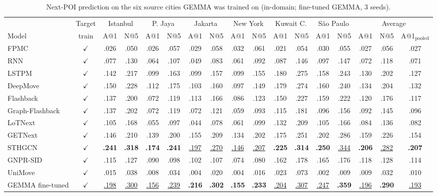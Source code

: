 \begin{table}[t]
\caption{Next-POI prediction on the six source cities GEMMA was trained on (in-domain; fine-tuned GEMMA, 3 seeds).}
\label{tab:main-source}
\scriptsize\setlength{\tabcolsep}{1.7pt}
\begin{tabular}{l c cc cc cc cc cc cc ccc}
\toprule
 & Target & \multicolumn{2}{c}{Istanbul} & \multicolumn{2}{c}{P. Jaya} & \multicolumn{2}{c}{Jakarta} & \multicolumn{2}{c}{New York} & \multicolumn{2}{c}{Kuwait C.} & \multicolumn{2}{c}{São Paulo} & \multicolumn{3}{c}{Average} \\
\cmidrule(lr){3-14}\cmidrule(lr){15-17}
Model & train & A@1 & N@5 & A@1 & N@5 & A@1 & N@5 & A@1 & N@5 & A@1 & N@5 & A@1 & N@5 & A@1 & N@5 & A@1$_{\text{pooled}}$ \\
\midrule
FPMC & $\checkmark$ & .026 & .050 & .026 & .057 & .029 & .058 & .032 & .061 & .021 & .054 & .030 & .055 & .027 & .056 & .027 \\
RNN & $\checkmark$ & .077 & .130 & .064 & .107 & .049 & .083 & .061 & .092 & .087 & .146 & .097 & .147 & .072 & .118 & .071 \\
LSTPM & $\checkmark$ & .142 & .217 & .099 & .163 & .099 & .157 & .099 & .155 & .180 & .275 & .158 & .243 & .130 & .202 & .127 \\
DeepMove & $\checkmark$ & .150 & .228 & .112 & .175 & .103 & .160 & .097 & .149 & .179 & .274 & .160 & .240 & .134 & .204 & .132 \\
Flashback & $\checkmark$ & .137 & .200 & .072 & .119 & .113 & .166 & .086 & .123 & .150 & .227 & .159 & .222 & .120 & .176 & .117 \\
Graph-Flashback & $\checkmark$ & .137 & .202 & .072 & .119 & .072 & .121 & .059 & .093 & .115 & .181 & .096 & .156 & .092 & .145 & .096 \\
LoTNext & $\checkmark$ & .105 & .168 & .055 & .097 & .044 & .078 & .061 & .099 & .132 & .209 & .105 & .166 & .084 & .136 & .082 \\
GETNext & $\checkmark$ & .146 & .210 & .139 & .200 & .155 & .209 & .134 & .202 & .175 & .251 & .202 & .286 & .159 & .226 & .154 \\
STHGCN & $\checkmark$ & \textbf{.241} & \textbf{.318} & \textbf{.174} & \textbf{.241} & \underline{.197} & \underline{.270} & \underline{.146} & \underline{.207} & \textbf{.225} & \textbf{.314} & \textbf{.250} & \underline{.344} & \textbf{.206} & \underline{.282} & \textbf{.207} \\
GNPR-SID & $\checkmark$ & .115 & .127 & .090 & .098 & .102 & .107 & .074 & .080 & .162 & .178 & .165 & .176 & .118 & .128 & .114 \\
UniMove & $\checkmark$ & .015 & .038 & .008 & .034 & .004 & .020 & .004 & .016 & .023 & .073 & .002 & .009 & .009 & .032 & .010 \\
\midrule
\rowcolor{gemmarow}GEMMA fine-tuned & $\checkmark$ & \underline{.198} & \underline{.300} & \underline{.156} & \underline{.239} & \textbf{.216} & \textbf{.302} & \textbf{.155} & \textbf{.233} & \underline{.204} & \underline{.307} & \underline{.247} & \textbf{.359} & \underline{.196} & \textbf{.290} & \underline{.193} \\
\bottomrule
\end{tabular}
\end{table}
